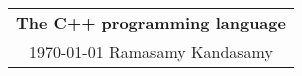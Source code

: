 



\raggedright
\footnotesize
\begin{multicols*}{3}
\setlength{\premulticols}{1pt}
\setlength{\postmulticols}{1pt}
\setlength{\multicolsep}{1pt}
\setlength{\columnsep}{2pt}



\begin{center}
\begin{tabular}{c}
\Large{\textbf{The C++ programming language}}\\
\today
Ramasamy Kandasamy\\
\end{tabular}
\end{center}




\vfill\null
\columnbreak



\vfill\null
\columnbreak

% 

















\vfill\null
\pagebreak















\end{multicols*}




